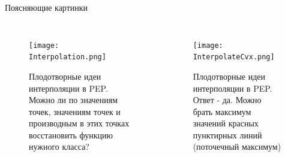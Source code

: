 \documentclass{beamer}
\begin{document}
\begin{frame}{Поясняющие картинки}
\begin{columns}[c]
\begin{figure}
\texttt{[image: Interpolation.png]}
    \caption{Плодотворные идеи интерполяции в PEP. Можно ли по значениям точек, значениям точек и производным в этих точках восстановить функцию нужного класса?}
\end{figure}
\begin{figure}
\texttt{[image: InterpolateCvx.png]}
    \caption{Плодотворные идеи интерполяции в PEP. Ответ - да. Можно брать максимум значений красных пунктирных линий (поточечный максимум)}
\end{figure}
\end{columns}
\end{frame}
\end{document}
